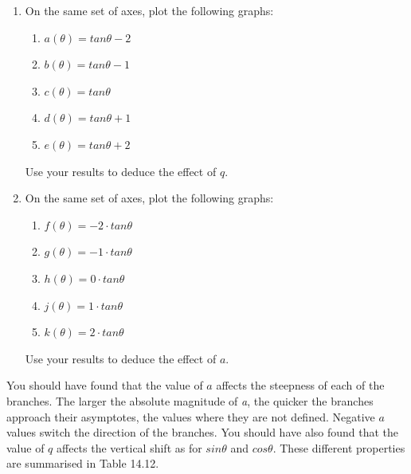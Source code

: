         \label{m39414*id90310}\begin{enumerate}[noitemsep, label=\textbf{\arabic*}. ] 
            \label{m39414*uid74}\item On the same set of axes, plot the following graphs:
\label{m39414*id90326}\begin{enumerate}[noitemsep, label=\textbf{\alph*}. ] 
            \label{m39414*uid75}\item $a\left(\theta \right)=tan\theta -2$\label{m39414*uid76}\item $b\left(\theta \right)=tan\theta -1$\label{m39414*uid77}\item $c\left(\theta \right)=tan\theta $\label{m39414*uid78}\item $d\left(\theta \right)=tan\theta +1$\label{m39414*uid79}\item $e\left(\theta \right)=tan\theta +2$\end{enumerate}
Use your results to deduce the effect of $q$.
\label{m39414*uid80}\item On the same set of axes, plot the following graphs:
\label{m39414*id90547}\begin{enumerate}[noitemsep, label=\textbf{\alph*}. ] 
            \label{m39414*uid81}\item $f\left(\theta \right)=-2\ensuremath{\cdot}tan\theta $\label{m39414*uid82}\item $g\left(\theta \right)=-1\ensuremath{\cdot}tan\theta $\label{m39414*uid83}\item $h\left(\theta \right)=0\ensuremath{\cdot}tan\theta $\label{m39414*uid84}\item $j\left(\theta \right)=1\ensuremath{\cdot}tan\theta $\label{m39414*uid85}\item $k\left(\theta \right)=2\ensuremath{\cdot}tan\theta $\end{enumerate}
Use your results to deduce the effect of $a$.
\end{enumerate}
        \label{m39414*id90781}You should have found that the value of $a$ affects the steepness of each of the branches. The larger the absolute magnitude of \textsl{a}, the quicker the branches approach their asymptotes, the values where they are not defined. Negative $\mathit{a}$ values switch the direction of the branches.
You should have also found that the value of $q$ affects the vertical shift as for $sin\theta $ and $cos\theta $.
These different properties are summarised in Table 14.12.\par 

